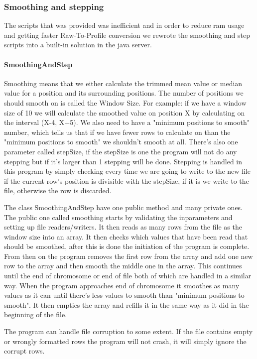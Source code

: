 \subsubsection{Smoothing and stepping}
The scripts that was provided was inefficient and in order to reduce ram usage and getting faster Raw-To-Profile conversion we rewrote the smoothing and step scripts into a built-in solution in the java server.

\paragraph{SmoothingAndStep}
Smoothing means that we either calculate the trimmed mean value or median value for a position and its surrounding positions. The number of positions we should smooth on is called the Window Size. For example: if we have a window size of 10 we will calculate the smoothed value on position X by calculating on the interval (X-4, X+5). We also need to have a "minimum positions to smooth" number, which tells us that if we have fewer rows to calculate on than the "minimum positions to smooth" we shouldn't smooth at all. There's also one parameter called stepSize, if the stepSize is one the program will not do any stepping but if it's larger than 1 stepping will be done. Stepping is handled in this program by simply checking every time we are going to write to the new file if the current row's position is divisible with the stepSize, if it is we write to the file, otherwise the row is discarded.

The class SmoothingAndStep have one public method and many private ones. The public one called smoothing starts by validating the inparameters and setting up file readers/writers. It then reads as many rows from the file as the window size into an array. It then checks which values that have been read that should be smoothed, after this is done the initiation of the program is complete. From then on the program removes the first row from the array and add one new row to the array and then smooth the middle one in the array. This continues until the end of chromosome or end of file both of which are handled in a similar way. When the program approaches end of chromosome it smoothes as many values as it can until there's less values to smooth than "minimum positions to smooth". It then empties the array and refills it in the same way as it did in the beginning of the file.

The program can handle file corruption to some extent. If the file contains empty or wrongly formatted rows the program will not crash, it will simply ignore the corrupt rows.

